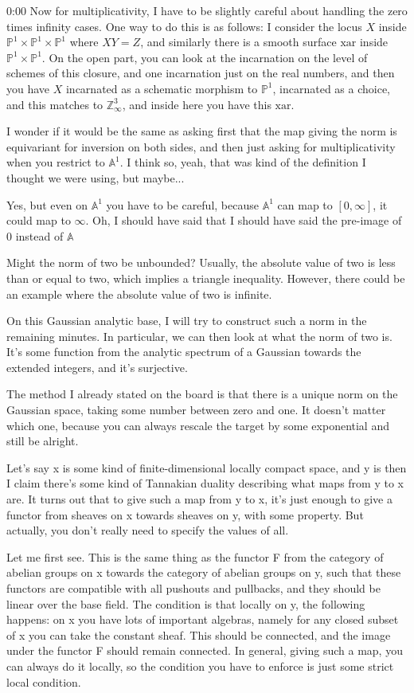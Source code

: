 \begin{unfinished}{0:00}
Now for multiplicativity, I have to be slightly careful about handling the zero times infinity cases. One way to do this is as follows: I consider the locus $X$ inside $\mathbb{P}^1 \times \mathbb{P}^1 \times \mathbb{P}^1$ where $XY = Z$, and similarly there is a smooth surface $\mathrm{xar}$ inside $\mathbb{P}^1 \times \mathbb{P}^1$. On the open part, you can look at the incarnation on the level of schemes of this closure, and one incarnation just on the real numbers, and then you have $X$ incarnated as a schematic morphism to $\mathbb{P}^1$, incarnated as a choice, and this matches to $\mathbb{Z}_{\infty}^3$, and inside here you have this $\mathrm{xar}$.

I wonder if it would be the same as asking first that the map giving the norm is equivariant for inversion on both sides, and then just asking for multiplicativity when you restrict to $\mathbb{A}^1$. I think so, yeah, that was kind of the definition I thought we were using, but maybe...

Yes, but even on $\mathbb{A}^1$ you have to be careful, because $\mathbb{A}^1$ can map to $[0, \infty]$, it could map to $\infty$. Oh, I should have said that I should have said the pre-image of $0$ instead of $\mathbb{A}$

Might the norm of two be unbounded? Usually, the absolute value of two is less than or equal to two, which implies a triangle inequality. However, there could be an example where the absolute value of two is infinite. 

On this Gaussian analytic base, I will try to construct such a norm in the remaining minutes. In particular, we can then look at what the norm of two is. It's some function from the analytic spectrum of a Gaussian towards the extended integers, and it's surjective. 

The method I already stated on the board is that there is a unique norm on the Gaussian space, taking some number between zero and one. It doesn't matter which one, because you can always rescale the target by some exponential and still be alright.

Let's say x is some kind of finite-dimensional locally compact space, and y is then I claim there's some kind of Tannakian duality describing what maps from y to x are. It turns out that to give such a map from y to x, it's just enough to give a functor from sheaves on x towards sheaves on y, with some property. But actually, you don't really need to specify the values of all.

Let me first see. This is the same thing as the functor F from the category of abelian groups on x towards the category of abelian groups on y, such that these functors are compatible with all pushouts and pullbacks, and they should be linear over the base field. The condition is that locally on y, the following happens: on x you have lots of important algebras, namely for any closed subset of x you can take the constant sheaf. This should be connected, and the image under the functor F should remain connected. In general, giving such a map, you can always do it locally, so the condition you have to enforce is just some strict local condition.


\end{unfinished}
